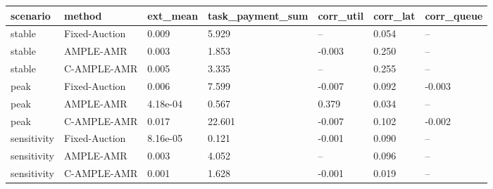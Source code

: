 \begin{tabular}{lllllll}
\toprule
scenario & method & ext\_mean & task\_payment\_sum & corr\_util & corr\_lat & corr\_queue \\
\midrule
stable & Fixed-Auction & 0.009 & 5.929 & -- & 0.054 & -- \\
stable & AMPLE-AMR & 0.003 & 1.853 & -0.003 & 0.250 & -- \\
stable & C-AMPLE-AMR & 0.005 & 3.335 & -- & 0.255 & -- \\
peak & Fixed-Auction & 0.006 & 7.599 & -0.007 & 0.092 & -0.003 \\
peak & AMPLE-AMR & 4.18e-04 & 0.567 & 0.379 & 0.034 & -- \\
peak & C-AMPLE-AMR & 0.017 & 22.601 & -0.007 & 0.102 & -0.002 \\
sensitivity & Fixed-Auction & 8.16e-05 & 0.121 & -0.001 & 0.090 & -- \\
sensitivity & AMPLE-AMR & 0.003 & 4.052 & -- & 0.096 & -- \\
sensitivity & C-AMPLE-AMR & 0.001 & 1.628 & -0.001 & 0.019 & -- \\
\bottomrule
\end{tabular}
